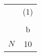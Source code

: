 {
\def\sym#1{\ifmmode^{#1}\else\(^{#1}\)\fi}
\begin{tabular}{l*{1}{c}}
\hline\hline
            &\multicolumn{1}{c}{(1)}\\
            &\multicolumn{1}{c}{}\\
            &           b\\
\hline
\hline
\(N\)       &          10\\
\hline\hline
\end{tabular}
}
